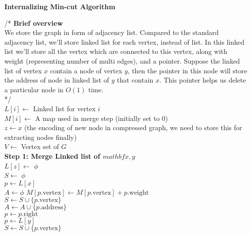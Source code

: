 \documentclass[a4paper]{article}
\begin{document}
\begin{question}
\textbf{Internalizing Min-cut Algorithm}
\end{question}
\begin{algorithm}[H]
\SetAlgoLined
{}
  /* \textbf{Brief overview}\\
    We store the graph in form of adjacency list. Compared to the standard adjacency list, we'll store linked list for each vertex, instead of list. In this linked list we'll store all the vertex which are connected to this vertex, along with weight (representing number of multi edges), and a pointer. Suppose the linked list of vertex $x$ contain a node of vertex $y$, then the pointer in this node will store the address of node in linked list of $y$ that contain $x$. This pointer helps us delete a particular node in $O(1)$ time. 
    \\
  */\\
  $L[i] \leftarrow$ Linked list for vertex $i$ \\
  $M[i] \leftarrow$ A map used in merge step (initially set to $0$)\\
  $z \leftarrow x$ (the encoding of new node in compressed graph, we need to store this for extracting nodes finally) \\
  $V \leftarrow$ Vertex set of $G$ \\
  \textbf{Step 1: Merge Linked list of $mathbf{x, y}$} \\
  $L[z] \leftarrow$ $\phi$ \\
  $S \leftarrow$ $\phi$ \\
  $p \leftarrow L[x]$ \\
  $A \leftarrow \phi$
   {
    $M[p.\text{vertex}] \leftarrow M[p.\text{vertex}] + p.\text{weight}$ \\
    $S \leftarrow S \cup \{ p.\text{vertex} \}$ \\
    $A \leftarrow A \cup \{ p.\text{address} \}$ \\
    $p \leftarrow p.\text{right}$ \\
  }
  $p \leftarrow L[y]$ \\
   {
     {
      $S \leftarrow S \cup \{ p.\text{vertex} \}$ \\
}}
\end{algorithm}
\end{document}
